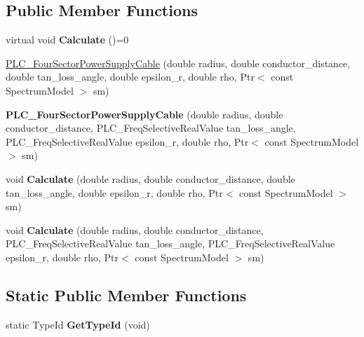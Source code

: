 \subsection*{\-Public \-Member \-Functions}
\begin{DoxyCompactItemize}
\item 
\hypertarget{classns3_1_1PLC__FourSectorPowerSupplyCable_a30d3b7cff004bfcf29d965b9ffe52fef}{virtual void {\bfseries \-Calculate} ()=0}\label{classns3_1_1PLC__FourSectorPowerSupplyCable_a30d3b7cff004bfcf29d965b9ffe52fef}

\item 
\hyperlink{classns3_1_1PLC__FourSectorPowerSupplyCable_adc4b542d87d2fbbd71a7cc82d78fed54}{\-P\-L\-C\-\_\-\-Four\-Sector\-Power\-Supply\-Cable} (double radius, double conductor\-\_\-distance, double tan\-\_\-loss\-\_\-angle, double epsilon\-\_\-r, double rho, \-Ptr$<$ const \-Spectrum\-Model $>$ sm)
\item 
\hypertarget{classns3_1_1PLC__FourSectorPowerSupplyCable_a135bd86a7010f3089ec02ba353b56b8e}{{\bfseries \-P\-L\-C\-\_\-\-Four\-Sector\-Power\-Supply\-Cable} (double radius, double conductor\-\_\-distance, \-P\-L\-C\-\_\-\-Freq\-Selective\-Real\-Value tan\-\_\-loss\-\_\-angle, \-P\-L\-C\-\_\-\-Freq\-Selective\-Real\-Value epsilon\-\_\-r, double rho, \-Ptr$<$ const \-Spectrum\-Model $>$ sm)}\label{classns3_1_1PLC__FourSectorPowerSupplyCable_a135bd86a7010f3089ec02ba353b56b8e}

\item 
\hypertarget{classns3_1_1PLC__FourSectorPowerSupplyCable_a68021099bd5455a404e2f51170d1f7f0}{void {\bfseries \-Calculate} (double radius, double conductor\-\_\-distance, double tan\-\_\-loss\-\_\-angle, double epsilon\-\_\-r, double rho, \-Ptr$<$ const \-Spectrum\-Model $>$ sm)}\label{classns3_1_1PLC__FourSectorPowerSupplyCable_a68021099bd5455a404e2f51170d1f7f0}

\item 
\hypertarget{classns3_1_1PLC__FourSectorPowerSupplyCable_a7417a6184b2f12af393c5403d1bfa795}{void {\bfseries \-Calculate} (double radius, double conductor\-\_\-distance, \-P\-L\-C\-\_\-\-Freq\-Selective\-Real\-Value tan\-\_\-loss\-\_\-angle, \-P\-L\-C\-\_\-\-Freq\-Selective\-Real\-Value epsilon\-\_\-r, double rho, \-Ptr$<$ const \-Spectrum\-Model $>$ sm)}\label{classns3_1_1PLC__FourSectorPowerSupplyCable_a7417a6184b2f12af393c5403d1bfa795}

\end{DoxyCompactItemize}
\subsection*{\-Static \-Public \-Member \-Functions}
\begin{DoxyCompactItemize}
\item 
\hypertarget{classns3_1_1PLC__FourSectorPowerSupplyCable_a312ba34657a959b51f3fa6acac36199c}{static \-Type\-Id {\bfseries \-Get\-Type\-Id} (void)}\label{classns3_1_1PLC__FourSectorPowerSupplyCable_a312ba34657a959b51f3fa6acac36199c}

\end{DoxyCompactItemize}


